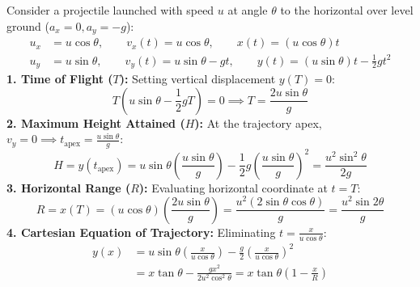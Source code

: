 \documentclass[10pt,twoside,openright]{book}
\begin{document}
\begin{formulabox}
Consider a projectile launched with speed $u$ at angle $\theta$ to the horizontal over level ground ($a_x = 0, a_y = -g$):
\begin{align}
  u_x &= u\cos\theta, \qquad v_x(t) = u\cos\theta, \qquad x(t) = (u\cos\theta)t \\
  u_y &= u\sin\theta, \qquad v_y(t) = u\sin\theta - gt, \qquad y(t) = (u\sin\theta)t - \frac{1}{2}gt^2
\end{align}
\textbf{1. Time of Flight ($T$):} Setting vertical displacement $y(T) = 0$:
\begin{equation}
  T\left(u\sin\theta - \frac{1}{2}gT\right) = 0 \implies T = \frac{2u\sin\theta}{g}
\end{equation}
\textbf{2. Maximum Height Attained ($H$):} At the trajectory apex, $v_y = 0 \implies t_{\text{apex}} = \frac{u\sin\theta}{g}$:
\begin{equation}
  H = y(t_{\text{apex}}) = u\sin\theta\left(\frac{u\sin\theta}{g}\right) - \frac{1}{2}g\left(\frac{u\sin\theta}{g}\right)^2 = \frac{u^2\sin^2\theta}{2g}
\end{equation}
\textbf{3. Horizontal Range ($R$):} Evaluating horizontal coordinate at $t = T$:
\begin{equation}
  R = x(T) = (u\cos\theta)\left(\frac{2u\sin\theta}{g}\right) = \frac{u^2(2\sin\theta\cos\theta)}{g} = \frac{u^2\sin 2\theta}{g}
\end{equation}
\textbf{4. Cartesian Equation of Trajectory:} Eliminating $t = \frac{x}{u\cos\theta}$:
\begin{align}
  y(x) &= u\sin\theta\left(\frac{x}{u\cos\theta}\right) - \frac{g}{2}\left(\frac{x}{u\cos\theta}\right)^2 \nonumber \\
  &= x\tan\theta - \frac{gx^2}{2u^2\cos^2\theta} = x\tan\theta\left(1 - \frac{x}{R}\right)
\end{align}
\end{formulabox}
\end{document}
